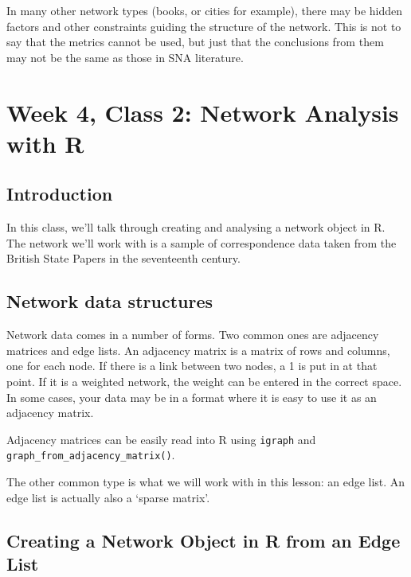 \documentclass[
]{book}
\begin{document}
In many other network types (books, or cities for example), there may be hidden factors and other constraints guiding the structure of the network. This is not to say that the metrics cannot be used, but just that the conclusions from them may not be the same as those in SNA literature.

\hypertarget{week-4-class-2-network-analysis-with-r}{%
\chapter{Week 4, Class 2: Network Analysis with R}\label{week-4-class-2-network-analysis-with-r}}

\hypertarget{introduction-3}{%
\section{Introduction}\label{introduction-3}}

In this class, we'll talk through creating and analysing a network object in R. The network we'll work with is a sample of correspondence data taken from the British State Papers in the seventeenth century.

\hypertarget{network-data-structures}{%
\section{Network data structures}\label{network-data-structures}}

Network data comes in a number of forms. Two common ones are adjacency matrices and edge lists. An adjacency matrix is a matrix of rows and columns, one for each node. If there is a link between two nodes, a 1 is put in at that point. If it is a weighted network, the weight can be entered in the correct space. In some cases, your data may be in a format where it is easy to use it as an adjacency matrix.

Adjacency matrices can be easily read into R using \texttt{igraph} and \texttt{graph\_from\_adjacency\_matrix()}.

The other common type is what we will work with in this lesson: an edge list. An edge list is actually also a `sparse matrix'.

\hypertarget{creating-a-network-object-in-r-from-an-edge-list}{%
\section{Creating a Network Object in R from an Edge List}\label{creating-a-network-object-in-r-from-an-edge-list}}
\end{document}
